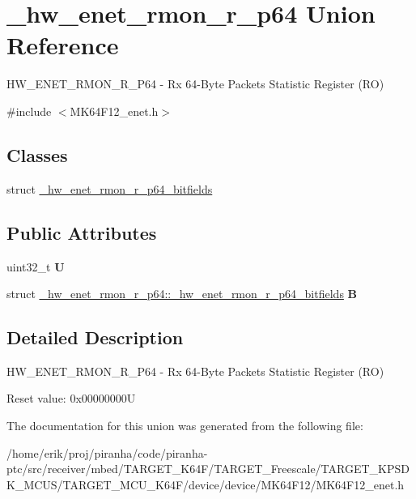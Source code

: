 \hypertarget{union__hw__enet__rmon__r__p64}{}\section{\+\_\+hw\+\_\+enet\+\_\+rmon\+\_\+r\+\_\+p64 Union Reference}
\label{union__hw__enet__rmon__r__p64}


H\+W\+\_\+\+E\+N\+E\+T\+\_\+\+R\+M\+O\+N\+\_\+\+R\+\_\+\+P64 -\/ Rx 64-\/\+Byte Packets Statistic Register (RO)  




{\ttfamily \#include $<$M\+K64\+F12\+\_\+enet.\+h$>$}

\subsection*{Classes}
\begin{DoxyCompactItemize}
\item 
struct \hyperlink{struct__hw__enet__rmon__r__p64_1_1__hw__enet__rmon__r__p64__bitfields}{\+\_\+hw\+\_\+enet\+\_\+rmon\+\_\+r\+\_\+p64\+\_\+bitfields}
\end{DoxyCompactItemize}
\subsection*{Public Attributes}
\begin{DoxyCompactItemize}
\item 
uint32\+\_\+t {\bfseries U}\hypertarget{union__hw__enet__rmon__r__p64_a3cde1f2479298d2ababc787ea17c2c79}{}\label{union__hw__enet__rmon__r__p64_a3cde1f2479298d2ababc787ea17c2c79}

\item 
struct \hyperlink{struct__hw__enet__rmon__r__p64_1_1__hw__enet__rmon__r__p64__bitfields}{\+\_\+hw\+\_\+enet\+\_\+rmon\+\_\+r\+\_\+p64\+::\+\_\+hw\+\_\+enet\+\_\+rmon\+\_\+r\+\_\+p64\+\_\+bitfields} {\bfseries B}\hypertarget{union__hw__enet__rmon__r__p64_a623463d304a5933bf30d9db9b4d4ceef}{}\label{union__hw__enet__rmon__r__p64_a623463d304a5933bf30d9db9b4d4ceef}

\end{DoxyCompactItemize}


\subsection{Detailed Description}
H\+W\+\_\+\+E\+N\+E\+T\+\_\+\+R\+M\+O\+N\+\_\+\+R\+\_\+\+P64 -\/ Rx 64-\/\+Byte Packets Statistic Register (RO) 

Reset value\+: 0x00000000U 

The documentation for this union was generated from the following file\+:\begin{DoxyCompactItemize}
\item 
/home/erik/proj/piranha/code/piranha-\/ptc/src/receiver/mbed/\+T\+A\+R\+G\+E\+T\+\_\+\+K64\+F/\+T\+A\+R\+G\+E\+T\+\_\+\+Freescale/\+T\+A\+R\+G\+E\+T\+\_\+\+K\+P\+S\+D\+K\+\_\+\+M\+C\+U\+S/\+T\+A\+R\+G\+E\+T\+\_\+\+M\+C\+U\+\_\+\+K64\+F/device/device/\+M\+K64\+F12/M\+K64\+F12\+\_\+enet.\+h\end{DoxyCompactItemize}

